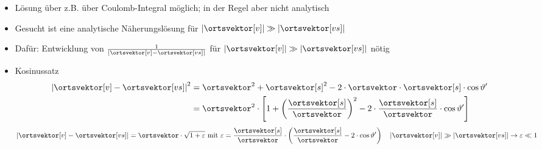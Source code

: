 \begin{frame}
\begin{itemize}[<+->]
          \item Lösung über z.B. über Coulomb-Integral möglich; in der Regel aber nicht analytisch 
          \item Gesucht ist eine analytische Näherungslösung für \(\left| \ortsvektor[v] \right| \gg \left| \ortsvektor[vs] \right| \)
          \item Dafür: Entwicklung von $\frac{1}{|\ortsvektor[v]-\ortsvektor[vs]|}$ für \(\left| \ortsvektor[v] \right| \gg \left| \ortsvektor[vs] \right| \) nötig
          \item Kosinussatz
            \begin{align*}
              	\left| \ortsvektor[v] - \ortsvektor[vs] \right|^2
		&= \ortsvektor^2 + \ortsvektor[s]^2 - 2 \cdot \ortsvektor \cdot \ortsvektor[s] \cdot \cos \vartheta' \\
		&= \ortsvektor^2 \cdot \left[ 1 + \left(\dfrac{\ortsvektor[s]}{\ortsvektor} \right)^2 - 2 \cdot \dfrac{\ortsvektor[s]}{\ortsvektor} \cdot
		 \cos \vartheta' \right]
            \end{align*}
            \begin{equation*}
	\left| \ortsvektor[v] - \ortsvektor[vs] \right| = \ortsvektor \cdot \sqrt{1 + \varepsilon} \text{ mit } \varepsilon = \dfrac{\ortsvektor[s]}{\ortsvektor} \cdot \left( \dfrac{\ortsvektor[s]}{\ortsvektor} - 2 \cdot \cos \vartheta' \right) \quad \left| \ortsvektor[v] \right| \gg \left| \ortsvektor[vs] \right| \to \varepsilon \ll 1
\end{equation*}

          \end{itemize}
        
        
        \end{frame}

